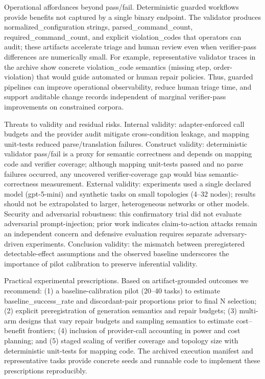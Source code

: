 \documentclass[conference]{IEEEtran}
\begin{document}
Operational affordances beyond pass/fail. Deterministic guarded workflows provide benefits not captured by a single binary endpoint. The validator produces normalized\_configuration strings, parsed\_command\_count, required\_command\_count, and explicit violation\_codes that operators can audit; these artifacts accelerate triage and human review even when verifier-pass differences are numerically small. For example, representative validator traces in the archive show concrete violation\_code semantics (missing step, order-violation) that would guide automated or human repair policies. Thus, guarded pipelines can improve operational observability, reduce human triage time, and support auditable change records independent of marginal verifier-pass improvements on constrained corpora.

Threats to validity and residual risks. Internal validity: adapter-enforced call budgets and the provider audit mitigate cross-condition leakage, and mapping unit-tests reduced parse/translation failures. Construct validity: deterministic validator pass/fail is a proxy for semantic correctness and depends on mapping code and verifier coverage; although mapping unit-tests passed and no parse failures occurred, any uncovered verifier-coverage gap would bias semantic-correctness measurement. External validity: experiments used a single declared model (gpt-5-mini) and synthetic tasks on small topologies (4--32 nodes); results should not be extrapolated to larger, heterogeneous networks or other models. Security and adversarial robustness: this confirmatory trial did not evaluate adversarial prompt-injection; prior work indicates claim-to-action attacks remain an independent concern and defensive evaluation requires separate adversary-driven experiments. Conclusion validity: the mismatch between preregistered detectable-effect assumptions and the observed baseline underscores the importance of pilot calibration to preserve inferential validity.

Practical experimental prescriptions. Based on artifact-grounded outcomes we recommend: (1) a baseline-calibration pilot (20--40 tasks) to estimate baseline\_success\_rate and discordant-pair proportions prior to final N selection; (2) explicit preregistration of generation semantics and repair budgets; (3) multi-arm designs that vary repair budgets and sampling semantics to estimate cost--benefit frontiers; (4) inclusion of provider-call accounting in power and cost planning; and (5) staged scaling of verifier coverage and topology size with deterministic unit-tests for mapping code. The archived execution manifest and representative tasks provide concrete seeds and runnable code to implement these prescriptions reproducibly.
\end{document}

